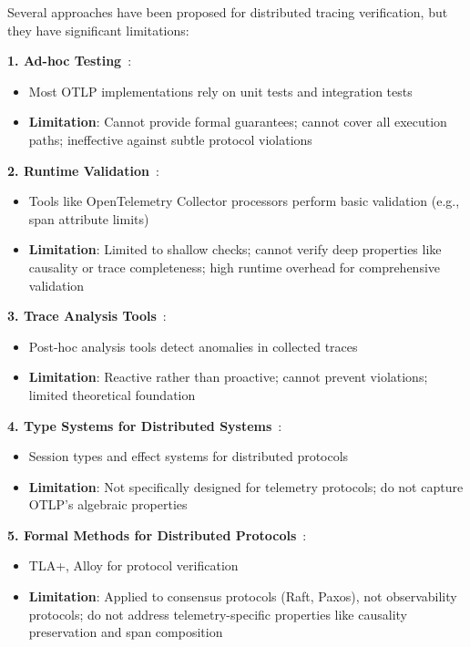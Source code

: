 Several approaches have been proposed for distributed tracing verification, but they have significant limitations:

\textbf{1. Ad-hoc Testing}~\cite{otel-sdk-tests,jaeger-tests}:
\begin{itemize}
\item Most OTLP implementations rely on unit tests and integration tests
\item \textbf{Limitation}: Cannot provide formal guarantees; cannot cover all execution paths; ineffective against subtle protocol violations
\end{itemize}

\textbf{2. Runtime Validation}~\cite{otel-collector}:
\begin{itemize}
\item Tools like OpenTelemetry Collector processors perform basic validation (e.g., span attribute limits)
\item \textbf{Limitation}: Limited to shallow checks; cannot verify deep properties like causality or trace completeness; high runtime overhead for comprehensive validation
\end{itemize}

\textbf{3. Trace Analysis Tools}~\cite{tracezip,autoscope}:
\begin{itemize}
\item Post-hoc analysis tools detect anomalies in collected traces
\item \textbf{Limitation}: Reactive rather than proactive; cannot prevent violations; limited theoretical foundation
\end{itemize}

\textbf{4. Type Systems for Distributed Systems}~\cite{session-types,dependent-types}:
\begin{itemize}
\item Session types and effect systems for distributed protocols
\item \textbf{Limitation}: Not specifically designed for telemetry protocols; do not capture OTLP's algebraic properties
\end{itemize}

\textbf{5. Formal Methods for Distributed Protocols}~\cite{tla-plus,ivy}:
\begin{itemize}
\item TLA+, Alloy for protocol verification
\item \textbf{Limitation}: Applied to consensus protocols (Raft, Paxos), not observability protocols; do not address telemetry-specific properties like causality preservation and span composition
\end{itemize}

